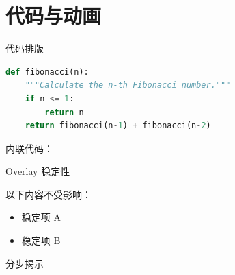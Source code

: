 \section{代码与动画}

\begin{frame}[fragile]{代码排版}
\begin{lstlisting}[language=Python]
def fibonacci(n):
    """Calculate the n-th Fibonacci number."""
    if n <= 1:
        return n
    return fibonacci(n-1) + fibonacci(n-2)
\end{lstlisting}
  内联代码：
\end{frame}

\begin{frame}{Overlay 稳定性}

  以下内容不受影响：
  \begin{itemize}
    \item 稳定项 A
    \item 稳定项 B
  \end{itemize}
\end{frame}

\begin{frame}{分步揭示}
\end{frame}
